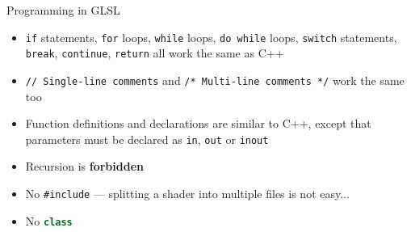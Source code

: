 \begin{frame}{Programming in GLSL}
	\begin{itemize}
		\pause\item \lstinline{if} statements, \lstinline{for} loops, \lstinline{while} loops, \lstinline{do while} loops, \lstinline{switch} statements,
			\lstinline{break}, \lstinline{continue}, \lstinline{return} all work the same as C++
		\pause\item \lstinline{// Single-line comments} and \lstinline{/* Multi-line comments */} work the same too
		\pause\item Function definitions and declarations are similar to C++, except that parameters must be declared as
			\lstinline{in}, \lstinline{out} or \lstinline{inout}
		\pause\item Recursion is \textbf{forbidden}
		\pause\item No \texttt{\#include} --- splitting a shader into multiple files is not easy...
		\pause\item No \lstinline[language=C++]{class}
	\end{itemize}
\end{frame}
